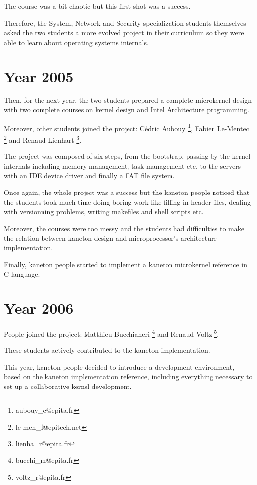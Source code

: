 The course was a bit chaotic but this first shot was a success.

Therefore, the System, Network and Security specialization students
themselves asked the two students a more evolved project in their
curriculum so they were able to learn about operating systems internals.

%
%

\section{Year 2005}

Then, for the next year, the two students prepared a complete microkernel
design with two complete courses on kernel design and Intel Architecture
programming.

Moreover, other students joined the project:
C\'edric Aubouy
  \footnote{aubouy\_c@epita.fr},
Fabien Le-Mentec
  \footnote{le-men\_f@epitech.net} and
Renaud Lienhart
  \footnote{lienha\_r@epita.fr}.

The project was composed of six steps, from the bootstrap, passing by
the kernel internals including memory management, task management etc.
to the servers with an IDE device driver and finally a FAT file system.

Once again, the whole project was a success but the kaneton people
noticed that the students took much time doing boring work like
filling in header files, dealing with versionning problems, writing
makefiles and shell scripts etc.

Moreover, the courses were too messy and the students had difficulties
to make the relation between kaneton design and microprocessor's
architecture implementation.

Finally, kaneton people started to implement a kaneton microkernel
reference in C language.

%
%

\section{Year 2006}

People joined the project:
Matthieu Bucchianeri
  \footnote{bucchi\_m@epita.fr} and
Renaud Voltz
  \footnote{voltz\_r@epita.fr}.

These students actively contributed to the kaneton implementation.

This year, kaneton people decided to introduce a development environment,
based on the kaneton implementation reference, including everything
necessary to set up a collaborative kernel development.

